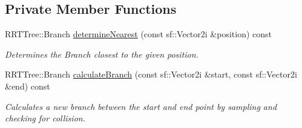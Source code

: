 \subsection*{Private Member Functions}
\begin{DoxyCompactItemize}
\item 
R\+R\+T\+Tree\+::\+Branch \hyperlink{classRRT_a21ff259bb7d646a09667b50602663abf}{determine\+Nearest} (const sf\+::\+Vector2i \&position) const 
\begin{DoxyCompactList}\small\item\em Determines the Branch closest to the given position. \end{DoxyCompactList}\item 
R\+R\+T\+Tree\+::\+Branch \hyperlink{classRRT_a1393c4dc3be5c4d66756dbfb8b75abee}{calculate\+Branch} (const sf\+::\+Vector2i \&start, const sf\+::\+Vector2i \&end) const 
\begin{DoxyCompactList}\small\item\em Calculates a new branch between the start and end point by sampling and checking for collision. \end{DoxyCompactList}\end{DoxyCompactItemize}
